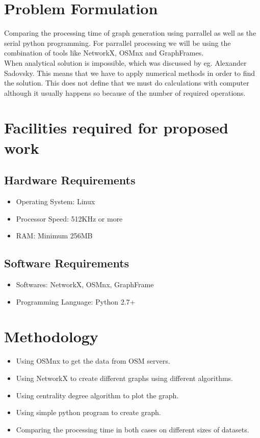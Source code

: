 \section{Problem Formulation}
 Comparing the processing time of graph generation using parrallel as well as the serial python programming. For parrallel processing we will be using the combination of tools like NetworkX, OSMnx and GraphFrames.\\
\noindent When analytical solution is impossible, which was discussed by eg. Alexander Sadovsky. This means that we have to apply numerical methods in order to find the solution. This does not define that we must do calculations with computer although it usually happens so because of the number of required operations.

\section{Facilities required for proposed work}
\subsection{Hardware Requirements}
\begin{itemize}
\item Operating System: Linux
\item Processor Speed: 512KHz or more
\item RAM: Minimum 256MB
\end{itemize}
\subsection{Software Requirements}
\begin{itemize}
\item Softwares: NetworkX, OSMnx, GraphFrame
\item Programming Language: Python 2.7+
\end{itemize}

\section{Methodology}
\begin{itemize}
\item Using OSMnx to get the data from OSM servers. 
\item Using NetworkX to create different graphs using different algorithms.
\item Using centrality degree algorithm to plot the graph.
\item Using simple python program to create graph.
\item Comparing the processing time in both cases on different sizes of datasets.
\end{itemize}

